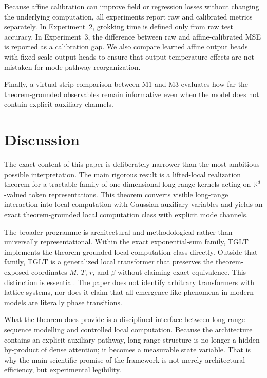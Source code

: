 \documentclass[11pt]{article}
\theoremstyle{definition}
\newcommand{\R}{\mathbb{R}}
\newcommand{\TGLT}{\ensuremath{\mathrm{TGLT}}}
\newcommand{\Mone}{\ensuremath{\mathrm{M1}}}
\newcommand{\Mthree}{\ensuremath{\mathrm{M3}}}
\begin{document}
Because affine calibration can improve field or regression losses without changing the underlying computation, all experiments report raw and calibrated metrics separately. In Experiment~2, grokking time is defined only from raw test accuracy. In Experiment~3, the difference between raw and affine-calibrated MSE is reported as a calibration gap. We also compare learned affine output heads with fixed-scale output heads to ensure that output-temperature effects are not mistaken for mode-pathway reorganization.

Finally, a virtual-strip comparison between \Mone{} and \Mthree{} evaluates how far the theorem-grounded observables remain informative even when the model does not contain explicit auxiliary channels.

\section*{Discussion}

The exact content of this paper is deliberately narrower than the most ambitious possible interpretation. The main rigorous result is a lifted-local realization theorem for a tractable family of one-dimensional long-range kernels acting on \(\R^d\)-valued token representations. This theorem converts visible long-range interaction into local computation with Gaussian auxiliary variables and yields an exact theorem-grounded local computation class with explicit mode channels.

The broader programme is architectural and methodological rather than universally representational. Within the exact exponential-sum family, \TGLT{} implements the theorem-grounded local computation class directly. Outside that family, \TGLT{} is a generalized local transformer that preserves the theorem-exposed coordinates \(M\), \(T\), \(r\), and \(\beta\) without claiming exact equivalence. This distinction is essential. The paper does not identify arbitrary transformers with lattice systems, nor does it claim that all emergence-like phenomena in modern models are literally phase transitions.

What the theorem does provide is a disciplined interface between long-range sequence modelling and controlled local computation. Because the architecture contains an explicit auxiliary pathway, long-range structure is no longer a hidden by-product of dense attention; it becomes a measurable state variable. That is why the main scientific promise of the framework is not merely architectural efficiency, but experimental legibility.
\end{document}
